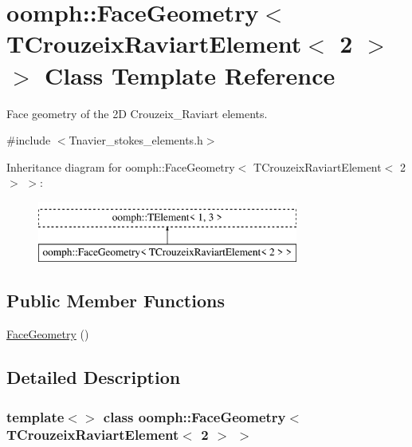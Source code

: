 \hypertarget{classoomph_1_1FaceGeometry_3_01TCrouzeixRaviartElement_3_012_01_4_01_4}{}\section{oomph\+:\+:Face\+Geometry$<$ T\+Crouzeix\+Raviart\+Element$<$ 2 $>$ $>$ Class Template Reference}
\label{classoomph_1_1FaceGeometry_3_01TCrouzeixRaviartElement_3_012_01_4_01_4}


Face geometry of the 2D Crouzeix\+\_\+\+Raviart elements.  




{\ttfamily \#include $<$Tnavier\+\_\+stokes\+\_\+elements.\+h$>$}

Inheritance diagram for oomph\+:\+:Face\+Geometry$<$ T\+Crouzeix\+Raviart\+Element$<$ 2 $>$ $>$\+:\begin{figure}[H]
\begin{center}
\leavevmode
\includegraphics[height=2.000000cm]{classoomph_1_1FaceGeometry_3_01TCrouzeixRaviartElement_3_012_01_4_01_4}
\end{center}
\end{figure}
\subsection*{Public Member Functions}
\begin{DoxyCompactItemize}
\item 
\hyperlink{classoomph_1_1FaceGeometry_3_01TCrouzeixRaviartElement_3_012_01_4_01_4_a01cfe03fc0e52784e0bbb9106bed79fb}{Face\+Geometry} ()
\end{DoxyCompactItemize}


\subsection{Detailed Description}
\subsubsection*{template$<$$>$\newline
class oomph\+::\+Face\+Geometry$<$ T\+Crouzeix\+Raviart\+Element$<$ 2 $>$ $>$}

